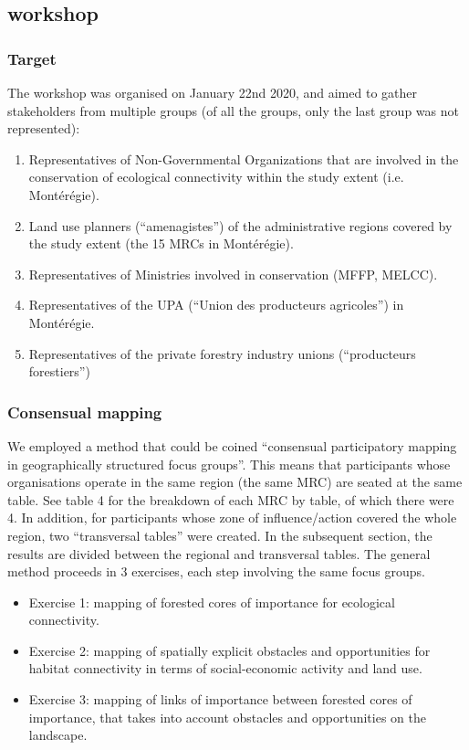\subsection{workshop}

\subsubsection{Target}

The workshop was organised on January 22nd 2020, and aimed to gather stakeholders from multiple groups (of all the groups, only the last group was not represented):
\begin{enumerate}
  \item Representatives of Non-Governmental Organizations that are involved in the conservation of ecological connectivity within the study extent (i.e. Montérégie).
  \item Land use planners (“amenagistes”) of the administrative regions covered by the study extent (the 15 MRCs in Montérégie).
  \item Representatives of Ministries involved in conservation (MFFP, MELCC).
  \item Representatives of the UPA (“Union des producteurs agricoles”) in Montérégie.
  \item Representatives of the private forestry industry unions (“producteurs forestiers”) \\
\end{enumerate}

\subsubsection{Consensual mapping}

We employed a method that could be coined “consensual participatory mapping in geographically structured focus groups”. This means that participants whose organisations operate in the same region (the same MRC) are seated at the same table. See table 4 for the breakdown of each MRC by table, of which there were 4. In addition, for participants whose zone of influence/action covered the whole region, two “transversal tables” were created. In the subsequent section, the results are divided between the regional and transversal tables.
The general method proceeds in 3 exercises, each step involving the same focus groups.

\begin{itemize}
  \item Exercise 1: mapping of forested cores of importance for ecological connectivity.
  \item Exercise 2: mapping of spatially explicit obstacles and opportunities for habitat connectivity in terms of social-economic activity and land use.
  \item Exercise 3: mapping of links of importance between forested cores of importance, that takes into account obstacles and opportunities on the landscape.
\end{itemize}

